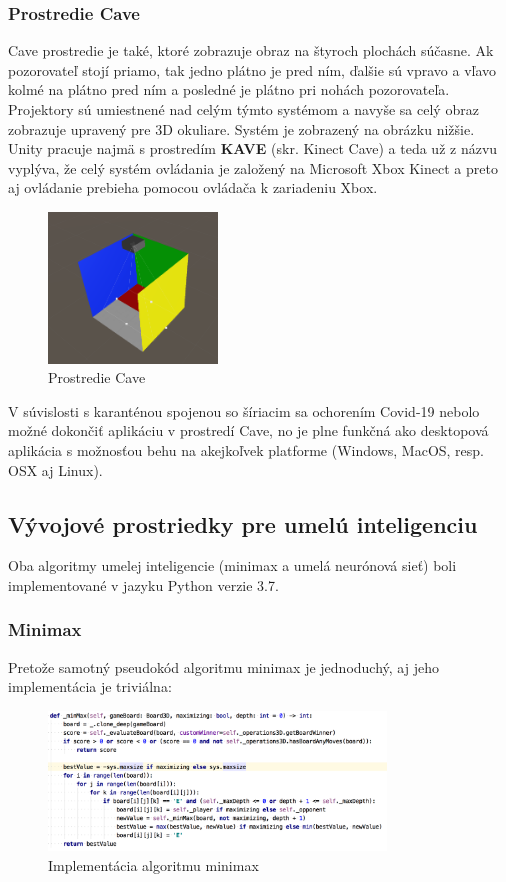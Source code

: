 \subsubsection{Prostredie Cave}
Cave prostredie je také, ktoré zobrazuje obraz na štyroch plochách súčasne.
Ak pozorovateľ stojí priamo, tak jedno plátno je pred ním, ďalšie sú vpravo a vľavo kolmé na plátno pred ním a posledné
je plátno pri nohách pozorovateľa.
Projektory sú umiestnené nad celým týmto systémom a navyše sa celý obraz zobrazuje upravený pre 3D okuliare.
Systém je zobrazený na obrázku nižšie.
Unity pracuje najmä s prostredím \textbf{KAVE} (skr. Kinect Cave) a teda už z názvu vyplýva, že celý systém ovládania
je založený na Microsoft Xbox Kinect a preto aj ovládanie prebieha pomocou ovládača k zariadeniu Xbox.

\begin{figure}[H]
    \centering
    \includegraphics[width=0.4\textwidth]{images/kave.png}
    \caption{Prostredie Cave}
\end{figure}

V súvislosti s karanténou spojenou so šíriacim sa ochorením Covid-19 nebolo možné dokončiť aplikáciu v prostredí Cave,
no je plne funkčná ako desktopová aplikácia s možnosťou behu na akejkoľvek platforme (Windows, MacOS, resp. OSX aj
Linux).

\subsection{Vývojové prostriedky pre umelú inteligenciu}\label{subsec:dev-tools-for-ai}

Oba algoritmy umelej inteligencie (minimax a umelá neurónová sieť) boli implementované v jazyku Python verzie 3.7.

\subsubsection{Minimax}

Pretože samotný pseudokód algoritmu minimax je jednoduchý, aj jeho implementácia je triviálna:
\begin{figure}[H]
    \centering
    \includegraphics[width=0.8\textwidth]{images/impl-minimax.jpg}
    \caption{Implementácia algoritmu minimax}
\end{figure}\label{figure:minimax-impl}

